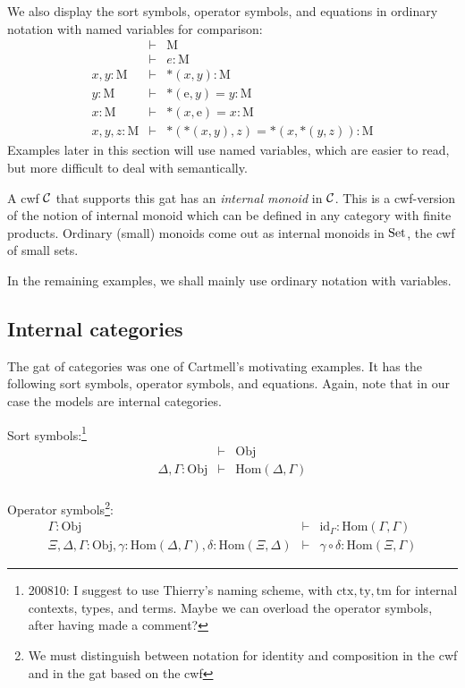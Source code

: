 \documentclass{lmcs}
\def\Obj{\mathrm{Obj}}
\def\Hom{\mathrm{Hom}}
\def\id{\mathrm{id}}
\def\Mon{\mathrm{M}}
\def\idmon{\mathrm{e}}
\def\comp{\mathrm{*}}
\newcommand{\ctx}{\mathrm{ctx}}
\newcommand{\ty}{\mathrm{ty}}
\newcommand{\tm}{\mathrm{tm}}
\begin{document}
We also display the sort symbols, operator symbols, 
and equations in ordinary notation with named variables for comparison:
\begin{eqnarray*}
&\vdash& \Mon\\
&\vdash& e : \Mon\\
x, y : \Mon &\vdash& \comp(x,y) : \Mon\\
y : \Mon &\vdash& \comp(\idmon,y) = y : \Mon\\
x : \Mon &\vdash& \comp(x,\idmon) = x : \Mon\\
x, y, z : \Mon &\vdash& \comp(\comp(x,y),z) = \comp(x,\comp(y,z)) : \Mon
\end{eqnarray*}
Examples later in this section will use named variables,
which are easier to read, but more difficult to deal with semantically.

A cwf ${\mathcal C}$ that supports this gat has an {\em internal monoid} in ${\mathcal C}$. This is a cwf-version of the notion of internal monoid which can be defined in any category with finite products. Ordinary (small) monoids come out as internal monoids in ${\rm Set}$, the cwf of small sets.

In the remaining examples, we shall mainly use ordinary notation with variables.

\subsection{Internal categories} The gat of categories was one of Cartmell's motivating examples. It has the following sort symbols, operator symbols, and equations. Again, note that in our case the models are internal categories.

Sort symbols:\footnote{200810: I suggest to use Thierry's naming scheme, with $\ctx, \ty, \tm$ for internal contexts, types, and terms. Maybe we can overload the operator symbols, after having made a comment?}
\begin{eqnarray*}
&\vdash& \Obj\\
\Delta, \Gamma : \Obj &\vdash& \Hom(\Delta,\Gamma)\\
\end{eqnarray*}

Operator symbols\footnote{We must distinguish between notation for identity and composition in the cwf and in the gat based on the cwf}:
\begin{eqnarray*}
\Gamma : \Obj &\vdash& \id_\Gamma : \Hom(\Gamma,\Gamma)\\
\Xi,\Delta,\Gamma : \Obj, \gamma : \Hom(\Delta,\Gamma), \delta : \Hom(\Xi,\Delta) &\vdash&
\gamma \circ \delta : \Hom(\Xi,\Gamma)
\end{eqnarray*}
\end{document}
